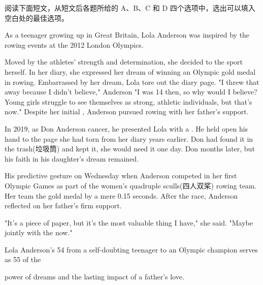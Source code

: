 \documentclass{英语试卷}
\begin{document}
\par 阅读下面短文，从短文后各题所给的 A、B、C 和 D 四个选项中，选出可以填入空白处的最佳选项。\par
\par As a teenager growing up in Great Britain, Lola Anderson was inspired by the rowing events at the 2012 London Olympics.\par
\par Moved by the athletes' strength and determination, she decided to  the sport herself. In her diary, she expressed her dream of winning an Olympic gold medal in rowing. Embarrassed by her  dream, Lola tore out the diary page. "I threw that away because I didn't believe," Anderson  "I was 14 then, so why would I believe? Young girls struggle to see themselves as strong, athletic individuals, but that's  now." Despite her initial , Anderson pursued rowing with her father's support.\par
\par In 2019, as Don Anderson  cancer, he presented Lola with a . He held open his hand to  the page she had torn from her diary years earlier. Don had found it in the trash(垃圾筒) and kept it,  she would need it one day. Don  months later, but his faith in his daughter's dream remained.\par
\par His predictive gesture  on Wednesday when Anderson competed in her first Olympic Games as part of the women's quadruple sculls(四人双桨) rowing team. Her team  the gold medal by a mere 0.15 seconds. After the race, Anderson reflected on her father's firm support.\par
\par "It's a piece of paper, but it's the most valuable thing I have," she said. "Maybe jointly with the  now."\par
\par Lola Anderson's 54 from a self-doubting teenager to an Olympic champion serves as 55 of the\par
\par power of dreams and the lasting impact of a father's love.\par
{}
\end{document}
